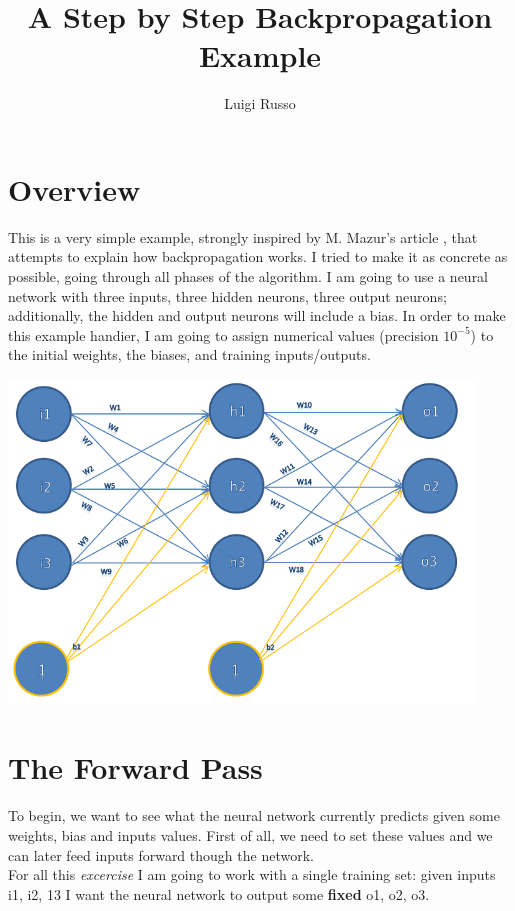 \documentclass[12pt]{article}
\title{A Step by Step Backpropagation Example}
\author{Luigi Russo}
\begin{document}
\maketitle

\section{Overview}
This is a very simple example, strongly inspired by M. Mazur's article \cite{articolo}, that attempts to explain how backpropagation works. I tried to make it as concrete as possible, going through all phases of the algorithm.
I am going to use a neural network with three inputs, three hidden neurons, three output neurons; additionally, the hidden and output neurons will include a bias.
In order to make this example handier, I am going to assign numerical values (precision
\begin{math}
10^{-5}
\end{math}) to the initial weights, the biases, and training inputs/outputs.
\begin{center}
\includegraphics[width=350pt, keepaspectratio]{image.png}
\end{center}

\section{The Forward Pass}
To begin, we want to see what the neural network currently predicts given some weights, bias and inputs values. First of all, we need to set these values and we can later feed inputs forward though the network.\\
For all this \textit{excercise} I am going to work with a single training set: given inputs i1, i2, 13 I want the neural network to output some \textbf{fixed} o1, o2, o3.
\end{document}
